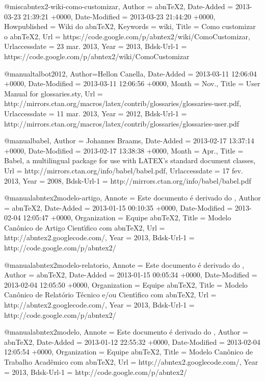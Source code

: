 @misc{abntex2-wiki-como-customizar,
	Author = {abnTeX2},
	Date-Added = {2013-03-23 21:39:21 +0000},
	Date-Modified = {2013-03-23 21:44:20 +0000},
	Howpublished = {Wiki do abnTeX2},
	Keywords = {wiki},
	Title = {Como customizar o abnTeX2},
	Url = {https://code.google.com/p/abntex2/wiki/ComoCustomizar},
	Urlaccessdate = {23 mar. 2013},
	Year = {2013},
	Bdsk-Url-1 = {https://code.google.com/p/abntex2/wiki/ComoCustomizar}}

@manual{talbot2012,
	Author={Hellon Canella},
	Date-Added = {2013-03-11 12:06:04 +0000},
	Date-Modified = {2013-03-11 12:06:56 +0000},
	Month = {Nov.},
	Title = {User Manual for glossaries.sty},
	Url = {http://mirrors.ctan.org/macros/latex/contrib/glossaries/glossaries-user.pdf},
	Urlaccessdate = {11 mar. 2013},
	Year = {2012},
	Bdsk-Url-1 = {http://mirrors.ctan.org/macros/latex/contrib/glossaries/glossaries-user.pdf}}

@manual{babel,
	Author = {Johannes Braams},
	Date-Added = {2013-02-17 13:37:14 +0000},
	Date-Modified = {2013-02-17 13:38:38 +0000},
	Month = {Apr.},
	Title = {Babel, a multilingual package for use with LATEX's standard document classes},
	Url = {http://mirrors.ctan.org/info/babel/babel.pdf},
	Urlaccessdate = {17 fev. 2013},
	Year = {2008},
	Bdsk-Url-1 = {http://mirrors.ctan.org/info/babel/babel.pdf}}

@manual{abntex2modelo-artigo,
	Annote = {Este documento {\'e} derivado do \cite{abnt-bibtex-doc}},
	Author = {abnTeX2},
	Date-Added = {2013-01-15 00:10:35 +0000},
	Date-Modified = {2013-02-04 12:05:47 +0000},
	Organization = {Equipe abnTeX2},
	Title = {Modelo Can{\^o}nico de Artigo Cient{\'\i}fico com abnTeX2},
	Url = {http://abntex2.googlecode.com/},
	Year = {2013},
	Bdsk-Url-1 = {http://code.google.com/p/abntex2/}}

@manual{abntex2modelo-relatorio,
	Annote = {Este documento {\'e} derivado do \cite{abnt-bibtex-doc}},
	Author = {abnTeX2},
	Date-Added = {2013-01-15 00:05:34 +0000},
	Date-Modified = {2013-02-04 12:05:50 +0000},
	Organization = {Equipe abnTeX2},
	Title = {Modelo Can{\^o}nico de Relat{\'o}rio T{\'e}cnico e/ou Cient{\'\i}fico com abnTeX2},
	Url = {http://abntex2.googlecode.com/},
	Year = {2013},
	Bdsk-Url-1 = {http://code.google.com/p/abntex2/}}

@manual{abntex2modelo,
	Annote = {Este documento {\'e} derivado do \cite{abnt-bibtex-doc}},
	Author = {abnTeX2},
	Date-Added = {2013-01-12 22:55:32 +0000},
	Date-Modified = {2013-02-04 12:05:54 +0000},
	Organization = {Equipe abnTeX2},
	Title = {Modelo Can{\^o}nico de Trabalho Acad{\^e}mico com abnTeX2},
	Url = {http://abntex2.googlecode.com/},
	Year = {2013},
	Bdsk-Url-1 = {http://code.google.com/p/abntex2/}}

